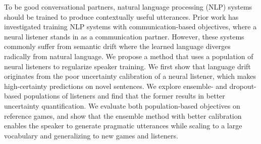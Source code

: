 To be good conversational partners, natural language processing (NLP) systems should be trained to produce contextually useful utterances. Prior work has investigated training NLP systems with communication-based objectives, where a neural listener stands in as a communication partner. However, these systems commonly suffer from semantic drift where the learned language diverges radically from natural language. We propose a method that uses a population of neural listeners to regularize speaker training. We first show that language drift originates from  the poor uncertainty calibration of a neural listener, which makes high-certainty predictions on novel sentences. We explore ensemble- and dropout-based populations of listeners and find that the former results in better uncertainty quantification. We evaluate both population-based objectives on reference games, and show that the ensemble method with better calibration enables the speaker to generate pragmatic utterances while scaling to a large vocabulary and generalizing to new games and listeners.

